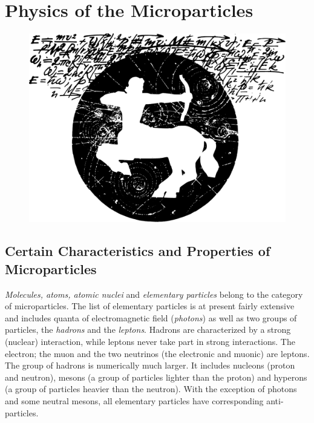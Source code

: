 \documentclass[a4paper,sfsidenotes,colorlinks=true]{tufte-book}
\numberwithin{equation}{section}
\numberwithin{figure}{section}
\begin{document}
\cleardoublepage
\mainmatter

\chapter{Physics of the Microparticles}
\label{ch-01}

\begin{figure}%
\centering
\includegraphics[width=\linewidth]{figures/ch-01.pdf}
\end{figure}
\cleardoublepage
\section{Certain Characteristics and Properties of Microparticles}
\label{sec-01}

\emph{Molecules, atoms, atomic nuclei} and
\emph{elementary particles} belong to the category of microparticles. The list of elementary particles is at present fairly extensive and includes quanta of electromagnetic field (\emph{photons}) as well as two groups of particles, the \emph{hadrons} and the \emph{leptons}. Hadrons are characterized by a strong (nuclear) interaction, while leptons never take part in strong interactions. The electron; the muon and the two neutrinos (the electronic and muonic) are leptons. The group of hadrons is numerically much larger. It includes nucleons (proton and neutron), mesons (a group of particles lighter than the proton) and hyperons (a group of particles heavier than the neutron). With the exception of photons and some neutral mesons, all elementary particles have corresponding anti-particles. 
\end{document}
